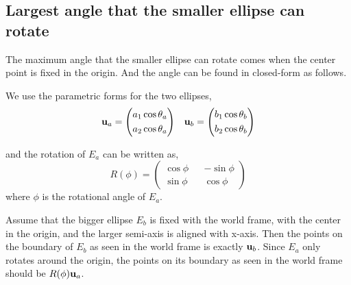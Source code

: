 \documentclass{article}
\begin{document}
\subsection{Largest angle that the smaller ellipse can rotate}
The maximum angle that the smaller ellipse can rotate comes when the center point is fixed in the origin. And the angle can be found in closed-form as follows.

We use the parametric forms for the two ellipses,
\begin{equation}
\begin{aligned}
{\bf u}_a = \left( 
\begin{aligned}
a_1 \cos \theta_a\\
a_2 \cos \theta_a
\end{aligned}
\right) &&
{\bf u}_b = \left( 
\begin{aligned}
b_1 \cos \theta_b\\
b_2 \cos \theta_b
\end{aligned}
\right)
\end{aligned}
\end{equation}

and the rotation of $E_a$ can be written as,
\begin{equation}
R(\phi) = \left(
\begin{aligned}
\cos\phi && -\sin\phi\\
\sin\phi && \cos\phi
\end{aligned}\right)
\end{equation}
where $\phi$ is the rotational angle of $E_a$.

Assume that the bigger ellipse $E_b$ is fixed with the world frame, with the center in the origin, and the larger semi-axis is aligned with x-axis. Then the points on the boundary of $E_b$ as seen in the world frame is exactly ${\bf u}_b$. Since $E_a$ only rotates around the origin, the points on its boundary as seen in the world frame should be $R(\phi) {\bf u}_a$.
\end{document}
